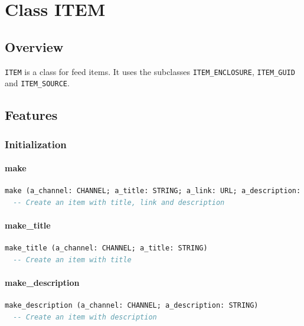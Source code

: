 \chapter{Class ITEM}
\label{sec:feed-item}


\section{Overview}
\label{sec:feed-item-overview}

\texttt{ITEM} is a class for feed items. It uses the subclasses
\texttt{ITEM\_ENCLOSURE}, \texttt{ITEM\_GUID} and \texttt{ITEM\_SOURCE}.


\section{Features}
\label{sec:feed-item-features}


\subsection{Initialization}
\label{sec:item-initialization}

\subsubsection{make}

\begin{lstlisting}[language=Eiffel]
make (a_channel: CHANNEL; a_title: STRING; a_link: URL; a_description: STRING)
  -- Create an item with title, link and description
\end{lstlisting}

\subsubsection{make\_title}

\begin{lstlisting}[language=Eiffel]
make_title (a_channel: CHANNEL; a_title: STRING)
  -- Create an item with title
\end{lstlisting}

\subsubsection{make\_description}

\begin{lstlisting}[language=Eiffel]
make_description (a_channel: CHANNEL; a_description: STRING)
  -- Create an item with description
\end{lstlisting}

